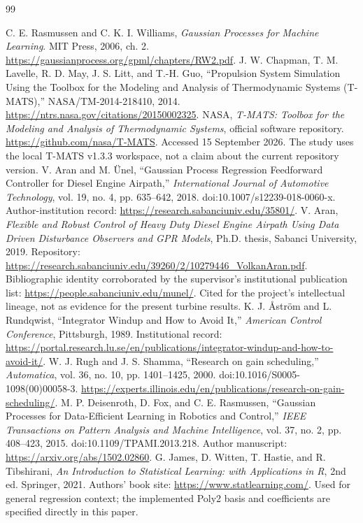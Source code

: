 \begin{thebibliography}{99}
 C. E. Rasmussen and C. K. I. Williams, \emph{Gaussian Processes for Machine Learning}. MIT Press, 2006, ch. 2. \url{https://gaussianprocess.org/gpml/chapters/RW2.pdf}.
 J. W. Chapman, T. M. Lavelle, R. D. May, J. S. Litt, and T.-H. Guo, ``Propulsion System Simulation Using the Toolbox for the Modeling and Analysis of Thermodynamic Systems (T-MATS),'' NASA/TM-2014-218410, 2014. \url{https://ntrs.nasa.gov/citations/20150002325}.
 NASA, \emph{T-MATS: Toolbox for the Modeling and Analysis of Thermodynamic Systems}, official software repository. \url{https://github.com/nasa/T-MATS}. Accessed 15 September 2026. The study uses the local T-MATS v1.3.3 workspace, not a claim about the current repository version.
 V. Aran and M. \"Unel, ``Gaussian Process Regression Feedforward Controller for Diesel Engine Airpath,'' \emph{International Journal of Automotive Technology}, vol. 19, no. 4, pp. 635--642, 2018. doi:10.1007/s12239-018-0060-x. Author-institution record: \url{https://research.sabanciuniv.edu/35801/}.
 V. Aran, \emph{Flexible and Robust Control of Heavy Duty Diesel Engine Airpath Using Data Driven Disturbance Observers and GPR Models}, Ph.D. thesis, Sabanci University, 2019. Repository: \url{https://research.sabanciuniv.edu/39260/2/10279446_VolkanAran.pdf}. Bibliographic identity corroborated by the supervisor's institutional publication list: \url{https://people.sabanciuniv.edu/munel/}. Cited for the project's intellectual lineage, not as evidence for the present turbine results.
 K. J. \AA str\"om and L. Rundqwist, ``Integrator Windup and How to Avoid It,'' \emph{American Control Conference}, Pittsburgh, 1989. Institutional record: \url{https://portal.research.lu.se/en/publications/integrator-windup-and-how-to-avoid-it/}.
 W. J. Rugh and J. S. Shamma, ``Research on gain scheduling,'' \emph{Automatica}, vol. 36, no. 10, pp. 1401--1425, 2000. doi:10.1016/S0005-1098(00)00058-3. \url{https://experts.illinois.edu/en/publications/research-on-gain-scheduling/}.
 M. P. Deisenroth, D. Fox, and C. E. Rasmussen, ``Gaussian Processes for Data-Efficient Learning in Robotics and Control,'' \emph{IEEE Transactions on Pattern Analysis and Machine Intelligence}, vol. 37, no. 2, pp. 408--423, 2015. doi:10.1109/TPAMI.2013.218. Author manuscript: \url{https://arxiv.org/abs/1502.02860}.
 G. James, D. Witten, T. Hastie, and R. Tibshirani, \emph{An Introduction to Statistical Learning: with Applications in R}, 2nd ed. Springer, 2021. Authors' book site: \url{https://www.statlearning.com/}. Used for general regression context; the implemented Poly2 basis and coefficients are specified directly in this paper.
\end{thebibliography}
